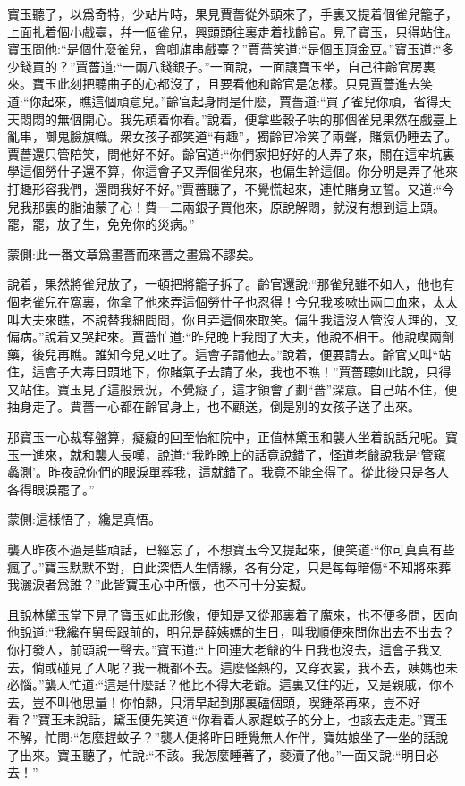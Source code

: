 \begin{parag}
    寶玉聽了，以爲奇特，少站片時，果見賈薔從外頭來了，手裏又提着個雀兒籠子，上面扎着個小戲臺，幷一個雀兒，興頭頭往裏走着找齡官。見了寶玉，只得站住。寶玉問他:“是個什麼雀兒，會啣旗串戲臺？”賈薔笑道:“是個玉頂金豆。”寶玉道:“多少錢買的？”賈薔道:“一兩八錢銀子。”一面說，一面讓寶玉坐，自己往齡官房裏來。寶玉此刻把聽曲子的心都沒了，且要看他和齡官是怎樣。只見賈薔進去笑道:“你起來，瞧這個頑意兒。”齡官起身問是什麼，賈薔道:“買了雀兒你頑，省得天天悶悶的無個開心。我先頑着你看。”說着，便拿些穀子哄的那個雀兒果然在戲臺上亂串，啣鬼臉旗幟。衆女孩子都笑道“有趣”，獨齡官冷笑了兩聲，賭氣仍睡去了。賈薔還只管陪笑，問他好不好。齡官道:“你們家把好好的人弄了來，關在這牢坑裏學這個勞什子還不算，你這會子又弄個雀兒來，也偏生幹這個。你分明是弄了他來打趣形容我們，還問我好不好。”賈薔聽了，不覺慌起來，連忙賭身立誓。又道:“今兒我那裏的脂油蒙了心！費一二兩銀子買他來，原說解悶，就沒有想到這上頭。罷，罷，放了生，免免你的災病。”\begin{note}蒙側:此一番文章爲畫薔而來薔之畫爲不謬矣。\end{note}說着，果然將雀兒放了，一頓把將籠子拆了。齡官還說:“那雀兒雖不如人，他也有個老雀兒在窩裏，你拿了他來弄這個勞什子也忍得！今兒我咳嗽出兩口血來，太太叫大夫來瞧，不說替我細問問，你且弄這個來取笑。偏生我這沒人管沒人理的，又偏病。”說着又哭起來。賈薔忙道:“昨兒晚上我問了大夫，他說不相干。他說喫兩劑藥，後兒再瞧。誰知今兒又吐了。這會子請他去。”說着，便要請去。齡官又叫“站住，這會子大毒日頭地下，你賭氣子去請了來，我也不瞧！”賈薔聽如此說，只得又站住。寶玉見了這般景況，不覺癡了，這才領會了劃“薔”深意。自己站不住，便抽身走了。賈薔一心都在齡官身上，也不顧送，倒是別的女孩子送了出來。
\end{parag}


\begin{parag}
    那寶玉一心裁奪盤算，癡癡的回至怡紅院中，正值林黛玉和襲人坐着說話兒呢。寶玉一進來，就和襲人長嘆，說道:“我昨晚上的話竟說錯了，怪道老爺說我是‘管窺蠡測’。昨夜說你們的眼淚單葬我，這就錯了。我竟不能全得了。從此後只是各人各得眼淚罷了。”\begin{note}蒙側:這樣悟了，纔是真悟。\end{note}襲人昨夜不過是些頑話，已經忘了，不想寶玉今又提起來，便笑道:“你可真真有些瘋了。”寶玉默默不對，自此深悟人生情緣，各有分定，只是每每暗傷“不知將來葬我灑淚者爲誰？”此皆寶玉心中所懷，也不可十分妄擬。
\end{parag}


\begin{parag}
    且說林黛玉當下見了寶玉如此形像，便知是又從那裏着了魔來，也不便多問，因向他說道:“我纔在舅母跟前的，明兒是薛姨媽的生日，叫我順便來問你出去不出去？你打發人，前頭說一聲去。”寶玉道:“上回連大老爺的生日我也沒去，這會子我又去，倘或碰見了人呢？我一概都不去。這麼怪熱的，又穿衣裳，我不去，姨媽也未必惱。”襲人忙道:“這是什麼話？他比不得大老爺。這裏又住的近，又是親戚，你不去，豈不叫他思量！你怕熱，只清早起到那裏磕個頭，喫鍾茶再來，豈不好看？”寶玉未說話，黛玉便先笑道:“你看着人家趕蚊子的分上，也該去走走。”寶玉不解，忙問:“怎麼趕蚊子？”襲人便將昨日睡覺無人作伴，寶姑娘坐了一坐的話說了出來。寶玉聽了，忙說:“不該。我怎麼睡著了，褻瀆了他。”一面又說:“明日必去！”
\end{parag}


